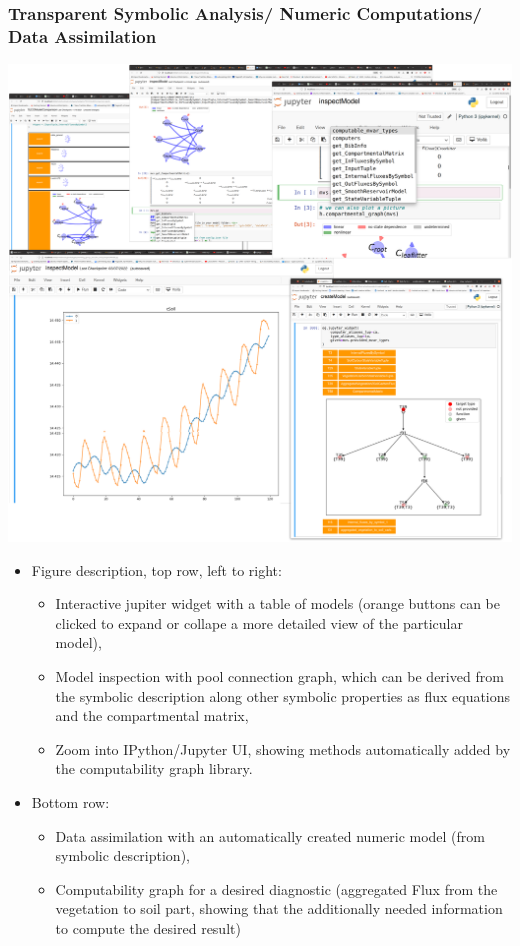 \documentclass[36pt]{article}
\begin{document}
\begin{tcbposter}
{\subsubsection*{Transparent Symbolic Analysis/ Numeric Computations/ Data Assimilation}
	  
    \includegraphics[width=\columnwidth]{TabScreenCombined.pdf}
	  \begin{itemize}
      \item Figure description, top row, left to right: 
	    \begin{itemize}
	      \item 
        Interactive jupiter widget with a table of models (orange buttons can be clicked to 
	      expand or collape a more detailed view of the particular model),
	      \item 
	      Model inspection with pool connection graph, which can be derived from the symbolic description
	      along other symbolic properties as flux equations and the compartmental matrix,
	      \item 
        Zoom into IPython/Jupyter UI, showing methods automatically added by the computability graph library. 
	    \end{itemize}
    \item Bottom row:  
	    \begin{itemize}
	      \item 
        Data assimilation with an automatically created numeric model (from symbolic description), 
	      \item 
        Computability graph for a desired diagnostic (aggregated Flux from the vegetation to soil part, showing 
        that the additionally needed information to compute the desired result)
	    \end{itemize}
	  \end{itemize}
}


\end{tcbposter}
\end{document}

